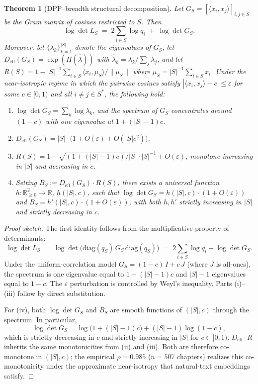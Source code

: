 \documentclass[10pt,a4paper]{amsart}
\newtheorem{theorem}{Theorem}
\begin{document}
\begin{theorem}[DPP--breadth structural decomposition]\label{thm:dpp-breadth}
Let $G_S = [\langle x_i, x_j \rangle]_{i,j \in S}$ be the Gram matrix of cosines restricted to $S$. Then
\[
\log \det L_S \;=\; 2 \sum_{i \in S} \log q_i \;+\; \log \det G_S.
\]
Moreover, let $\{\lambda_k\}_{k=1}^{|S|}$ denote the eigenvalues of $G_S$, let $D_{\mathrm{eff}}(G_S) = \exp(H(\hat{\lambda}))$ with $\hat{\lambda}_k = \lambda_k / \sum_j \lambda_j$, and let $R(S) = 1 - |S|^{-1}\sum_{i \in S} \langle x_i, \mu_S \rangle / \|\mu_S\|$ where $\mu_S = |S|^{-1} \sum_{i \in S} x_i$. Under the \emph{near-isotropic} regime in which the pairwise cosines satisfy $|\langle x_i, x_j \rangle - c| \leq \varepsilon$ for some $c \in [0, 1)$ and all $i \neq j \in S^*$, the following hold:
\begin{enumerate}
\item[(i)] $\log \det G_S = \sum_k \log \lambda_k$, and the spectrum of $G_S$ concentrates around $(1-c)$ with one eigenvalue at $1 + (|S|-1)c$.
\item[(ii)] $D_{\mathrm{eff}}(G_S) = |S| \cdot \big(1 + O(\varepsilon) + O(|S| c^2)\big)$.
\item[(iii)] $R(S) = 1 - \sqrt{(1 + (|S|-1)c)/|S|} \cdot |S|^{-1} + O(\varepsilon)$, monotone increasing in $|S|$ and decreasing in $c$.
\item[(iv)] Setting $B_S := D_{\mathrm{eff}}(G_S) \cdot R(S)$, there exists a universal function $h: \mathbb{R}_{\geq 0}^2 \to \mathbb{R}$, $h(|S|, c)$, such that $\log \det G_S = h(|S|, c) \cdot (1 + O(\varepsilon))$ and $B_S = h'(|S|, c) \cdot (1 + O(\varepsilon))$, with both $h, h'$ strictly increasing in $|S|$ and strictly decreasing in $c$.
\end{enumerate}
\end{theorem}

\begin{proof}[Proof sketch]
The first identity follows from the multiplicative property of determinants:
\[
\log \det L_S \;=\; \log \det\!\big(\mathrm{diag}(q_S)\, G_S\, \mathrm{diag}(q_S)\big) \;=\; 2 \sum_{i \in S} \log q_i + \log \det G_S.
\]
Under the uniform-correlation model $G_S = (1-c)\,I + c\,J$ (where $J$ is all-ones), the spectrum is one eigenvalue equal to $1 + (|S|-1)c$ and $|S|-1$ eigenvalues equal to $1-c$. The $\varepsilon$ perturbation is controlled by Weyl's inequality. Parts (i)--(iii) follow by direct substitution.

For (iv), both $\log \det G_S$ and $B_S$ are smooth functions of $(|S|, c)$ through the spectrum. In particular,
\[
\log \det G_S = \log\!\big(1 + (|S|-1)c\big) + (|S|-1)\log(1-c),
\]
which is strictly decreasing in $c$ and strictly increasing in $|S|$ for $c \in [0,1)$. $D_{\mathrm{eff}} \cdot R$ inherits the same monotonicities from (ii) and (iii). Both are therefore co-monotone in $(|S|, c)$; the empirical $\rho = 0.985$ ($n = 507$ chapters) realizes this co-monotonicity under the approximate near-isotropy that natural-text embeddings satisfy.
\end{proof}
\end{document}
